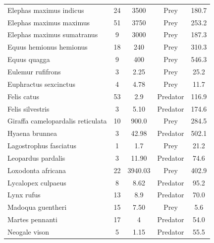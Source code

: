 \documentclass[12pt]{article}
\begin{document}
\begin{table}[!h]
\begin{center}
\begin{tabular}{lcccc}
Elephas maximus indicus           & 24         & 3500          & Prey          & 180.7          \\
Elephas maximus maximus           & 51         & 3750          & Prey          & 253.2          \\
Elephas maximus sumatranus        & 9          & 3000          & Prey          & 187.3          \\
Equus hemionus hemionus           & 18         & 240           & Prey          & 310.3          \\
Equus quagga                      & 9          & 400           & Prey          & 546.3          \\
Eulemur rufifrons                 & 3          & 2.25          & Prey          & 25.2           \\
Euphractus sexcinctus             & 4          & 4.78          & Prey          & 11.7           \\
Felis catus                       & 53         & 2.9           & Predator      & 116.9          \\
Felis silvestris                  & 3          & 5.10          & Predator      & 174.6          \\
Giraffa camelopardalis reticulata & 10         & 900.0         & Prey          & 284.5          \\
Hyaena brunnea                    & 3          & 42.98         & Predator      & 502.1          \\
Lagostrophus fasciatus            & 1          & 1.7           & Prey          & 21.2           \\
Leopardus pardalis                & 3          & 11.90         & Predator      & 74.6           \\
Loxodonta africana                & 22         & 3940.03       & Prey          & 402.9          \\
Lycalopex culpaeus                & 8          & 8.62          & Predator      & 95.2           \\
Lynx rufus                        & 13         & 8.9           & Predator      & 70.0           \\
Madoqua guentheri                 & 15         & 7.50          & Prey          & 5.6            \\
Martes pennanti                   & 17         & 4             & Predator      & 54.0           \\
Neogale vison                     & 5          & 1.15          & Predator      & 55.5           \\

\end{tabular}
\end{center}
\end{table}
\end{document}
